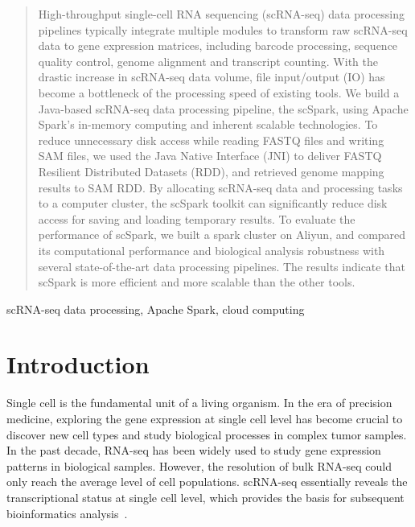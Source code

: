\documentclass[conference]{IEEEtran}
\begin{document}
\begin{abstract}
  High-throughput single-cell RNA sequencing (scRNA-seq) data processing pipelines typically integrate multiple modules to transform raw scRNA-seq data to gene expression matrices, including barcode processing, sequence quality control, genome alignment and transcript counting. 
  With the drastic increase in scRNA-seq data volume, file input/output (IO) has become a bottleneck of the processing speed of existing tools. 
We build a Java-based scRNA-seq data processing pipeline, the scSpark, using Apache Spark's in-memory computing and inherent scalable technologies. 
  To reduce unnecessary disk access while reading FASTQ files and writing SAM files, we used the Java Native Interface (JNI) to deliver FASTQ Resilient Distributed Datasets (RDD), and retrieved genome mapping results to SAM RDD. 
  By allocating scRNA-seq data and processing tasks to a computer cluster, the scSpark toolkit can significantly reduce disk access for saving and loading temporary results. 
  To evaluate the performance of scSpark, we built a spark cluster on Aliyun, and compared its computational performance and biological analysis robustness with several state-of-the-art data processing pipelines. The results indicate that scSpark is more efficient and more scalable than the other  tools. 
\end{abstract}

\begin{IEEEkeywords}
scRNA-seq data processing, Apache Spark, cloud computing
\end{IEEEkeywords}

\section{Introduction}
Single cell is the fundamental unit of a living organism.
In the era of precision medicine, exploring the gene expression at single cell level has become crucial to discover new cell types and study biological processes in complex tumor samples.
In the past decade, RNA-seq has been widely used to study gene expression patterns in biological samples.
However, the resolution of bulk RNA-seq could only reach the average level of cell populations. 
scRNA-seq essentially reveals the transcriptional status at single cell level, which provides the basis for subsequent bioinformatics analysis~\cite{Papalexi2018SinglecellRS}.
\end{document}
